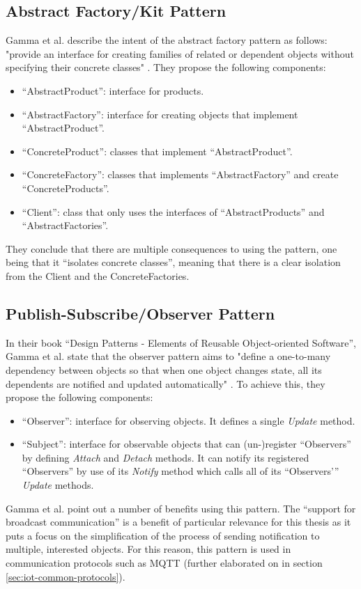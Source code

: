 \subsection{Abstract Factory/Kit Pattern}
Gamma et al. describe the intent of the abstract factory pattern as follows: "provide an interface for creating families of related or dependent objects without specifying their concrete classes" \cite{Gamma1998}. They propose the following components:
\begin{itemize}
    \item \enquote{AbstractProduct}: interface for products.
    \item \enquote{AbstractFactory}: interface for creating objects that implement \enquote{AbstractProduct}.
    \item \enquote{ConcreteProduct}: classes that implement \enquote{AbstractProduct}.
    \item \enquote{ConcreteFactory}: classes that implements \enquote{AbstractFactory} and create \enquote{ConcreteProducts}.
    \item \enquote{Client}: class that only uses the interfaces of \enquote{AbstractProducts} and \enquote{AbstractFactories}.
\end{itemize}
They conclude that there are multiple consequences to using the pattern, one being that it \enquote{isolates concrete classes}, meaning that there is a clear isolation from the Client and the ConcreteFactories.
\subsection{Publish-Subscribe/Observer Pattern}
In their book \enquote{Design Patterns - Elements of Reusable Object-oriented Software}, Gamma et al. state that the observer pattern aims to "define a one-to-many dependency between objects so that when one object changes state, all its dependents are notified and updated automatically" \cite{Gamma1998}. To achieve this, they propose the following components:
\begin{itemize}
    \item \enquote{Observer}: interface for observing objects. It defines a single \emph{Update} method.
    \item \enquote{Subject}: interface for observable objects that can (un-)register \enquote{Observers} by defining \emph{Attach} and \emph{Detach} methods. It can notify its registered \enquote{Observers} by use of its \emph{Notify} method which calls all of its \enquote{Observers'} \emph{Update} methods.
\end{itemize}
Gamma et al. point out a number of benefits using this pattern. The \enquote{support for broadcast communication} is a benefit of particular relevance for this thesis as it puts a focus on the simplification of the process of sending notification to multiple, interested objects. For this reason, this pattern is used in communication protocols such as \ac{MQTT} (further elaborated on in section \ref{sec:iot-common-protocols}).



